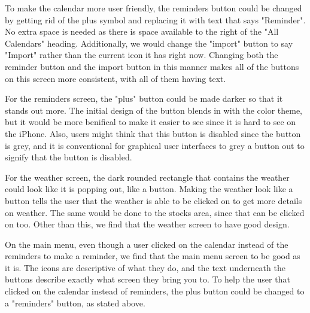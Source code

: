 To make the calendar more user friendly, the reminders button could be changed by getting rid of the plus symbol and replacing it with text that says "Reminder". No extra space is needed as there is space available to the right of the "All Calendars" heading. Additionally, we would change the "import" button to say "Import" rather than the current icon it has right now. Changing both the reminder button and the import button in this manner makes all of the buttons on this screen more consistent, with all of them having text.

For the reminders screen, the "plus" button could be made darker so that it stands out more. The initial design of the button blends in with the color theme, but it would be more benifical to make it easier to see since it is hard to see on the iPhone. Also, users might think that this button is disabled since the button is grey, and it is conventional for graphical user interfaces to grey a button out to signify that the button is disabled.

For the weather screen, the dark rounded rectangle that contains the weather could look like it is popping out, like a button. Making the weather look like a button tells the user that the weather is able to be clicked on to get more details on weather. The same would be done to the stocks area, since that can be clicked on too. Other than this, we find that the weather screen to have good design.

On the main menu, even though a user clicked on the calendar instead of the reminders to make a reminder, we find that the main menu screen to be good as it is. The icons are descriptive of what they do, and the text underneath the buttons describe exactly what screen they bring you to. To help the user that clicked on the calendar instead of reminders, the plus button could be changed to a "reminders" button, as stated above.